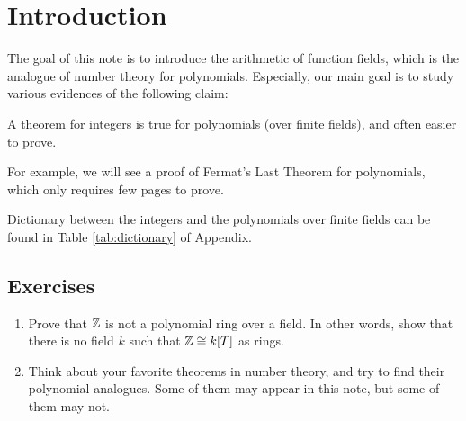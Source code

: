 \section{Introduction}
\label{sec:intro}

The goal of this note is to introduce the arithmetic of function fields, which is the analogue of number theory for polynomials.
Especially, our main goal is to study various evidences of the following claim:

\begin{myquote}
A theorem for integers is true for polynomials (over finite fields), and often easier to prove.
\end{myquote}
For example, we will see a proof of Fermat's Last Theorem for polynomials, which only requires few pages to prove.

Dictionary between the integers and the polynomials over finite fields can be found in Table \ref{tab:dictionary} of Appendix.


\subsection*{Exercises}
\begin{enumerate}
    \item Prove that $\mathbb{Z}$ is not a polynomial ring over a field. In other words, show that there is no field $k$ such that $\mathbb{Z} \cong k[T]$ as rings.
    \item Think about your favorite theorems in number theory, and try to find their polynomial analogues. Some of them may appear in this note, but some of them may not.
\end{enumerate}